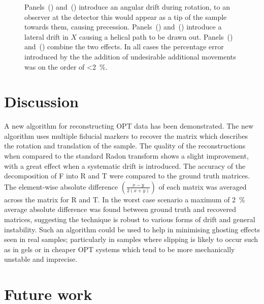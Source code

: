 \documentclass{osa-article}
\begin{document}
\begin{figure}
{          Panels~() and~() introduce an angular drift during rotation, to an observer at the detector this would appear as a tip of the sample towards them, causing precession.
          Panels~() and~() introduce a lateral drift in \(X\) causing a helical path to be drawn out.
          Panels~() and~() combine the two effects.
          In all cases the percentage error introduced by the the addition of undesirable additional movements was on the order of \SI{<2}{\percent}.
          }\label{fig:pc_sum_decompose}
\end{figure}

\section{Discussion}

A new algorithm for reconstructing OPT data has been demonstrated.
The new algorithm uses multiple fiducial markers to recover the matrix which describes the rotation and translation of the sample.
The quality of the reconstructions when compared to the standard \gls{Radon transform} shows a slight improvement, with a great effect when a systematic drift is introduced.
The accuracy of the decomposition of \gls{F} into \gls{R} and \gls{T} were compared to the ground truth matrices.
The element-wise absolute difference \(\left(\frac{x-y}{2(x+y)}\right)\) of each matrix was averaged across the matrix for \gls{R} and \gls{T}.
In the worst case scenario a maximum of \SI{2}{\percent} average absolute difference was found between ground truth and recovered matrices,
suggesting the technique is robust to various forms of drift and general instability.
Such an algorithm could be used to help in minimising ghosting effects seen in real samples; particularly in samples where slipping is likely to occur such as in gels or in cheaper \gls{OPT} systems which tend to be more mechanically unstable and imprecise.

\section{Future work}
\end{document}
